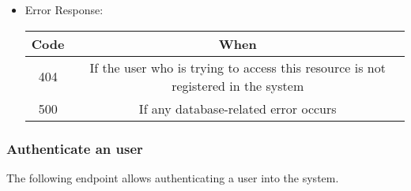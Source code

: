 \begin{itemize}
    \item Error Response:
    \begin{table}[!h]
    \centering 
    \begin{tabular}{|c|c|}
    \hline
    \multicolumn{1}{|c|}{\textbf{Code}} & \multicolumn{1}{c|}{\textbf{When}} \\ \hline
    404 & If the user who is trying to access this resource is not registered in the system \\\hline
    500 & If any database-related error occurs \\\hline
    \end{tabular} 
    \end{table} 
    
\end{itemize}


\newpage
\subsubsection*{Authenticate an user}

The following endpoint allows authenticating a user into the system.

